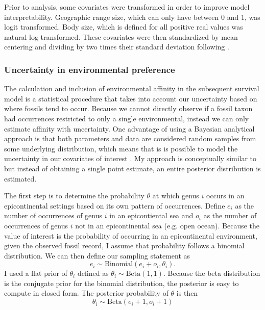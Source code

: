 \documentclass[12pt,letterpaper]{article}
\begin{document}
Prior to analysis, some covariates were transformed in order to improve model interpretability. Geographic range size, which can only have between 0 and 1, was logit transformed. Body size, which is defined for all positive real values was natural log transformed. These covariates were then standardized by mean centering and dividing by two times their standard deviation following \citet{Gelman2007}.

\subsubsection{Uncertainty in environmental preference}
The calculation and inclusion of environmental affinity in the subsequent survival model is a statistical procedure that takes into account our uncertainty based on where fossils tend to occur. Because we cannot directly observe if a fossil taxon had occurrences restricted to only a single environmental, instead we can only estimate affinity with uncertainty. One advantage of using a Bayesian analytical approach is that both parameters and data are considered random samples from some underlying distribution, which means that is is possible to model the uncertainty in our covariates of interest \citep{Gelman2013d}. My approach is conceptually similar to \citet{Simpson2009} but instead of obtaining a single point estimate, an entire posterior distribution is estimated.

The first step is to determine the probability \(\theta\) at which genus \(i\) occurs in an epicontinental settings based on its own pattern of occurrences. Define \(e_{i}\) as the number of occurrences of genus \(i\) in an epicontiental sea and \(o_{i}\) as the number of occurrences of genus \(i\) not in an epicontinental sea (e.g. open ocean). Because the value of interest is the probability of occurring in an epicontinental environment, given the observed fossil record, I assume that probability follows a binomial distribution. We can then define our sampling statement as
\begin{equation}
  e_{i} \sim \mathrm{Binomial}(e_{i} + o_{i}, \theta_{i}).
  \label{eq:epi_lik}
\end{equation}
I used a flat prior of \(\theta_{i}\) defined as \(\theta_{i} \sim \mathrm{Beta}(1, 1)\). Because the beta distribution is the conjugate prior for the binomial distribution, the posterior is easy to compute in closed form. The posterior probability of \(\theta\) is then 
\begin{equation}
  \theta_{i} \sim \mathrm{Beta}(e_{i} + 1, o_{i} + 1)
  \label{eq:epi_post}
\end{equation}
\end{document}
